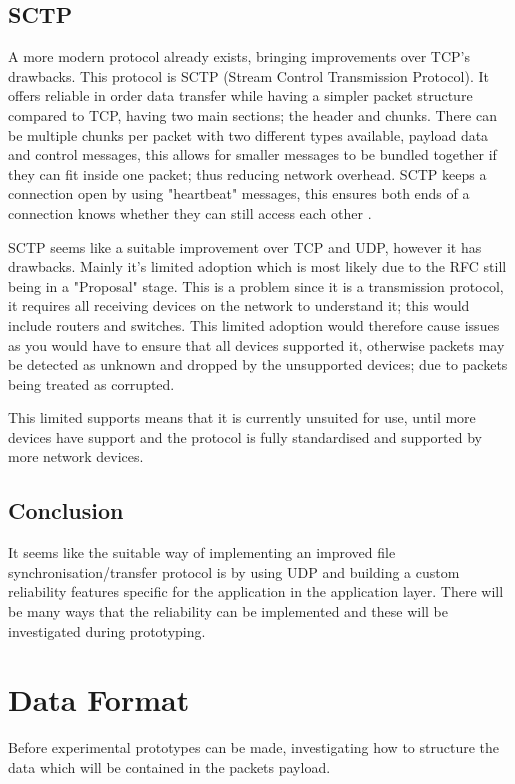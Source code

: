 \subsection*{SCTP}
A more modern protocol already exists, bringing improvements over TCP's drawbacks. This protocol is SCTP (Stream Control Transmission Protocol). It offers reliable in order data transfer while having a simpler packet structure compared to TCP, having two main sections; the header and chunks. There can be multiple chunks per packet with two different types available, payload data and control messages, this allows for smaller messages to be bundled together if they can fit inside one packet; thus reducing network overhead. SCTP keeps a connection open by using "heartbeat" messages, this ensures both ends of a connection knows whether they can still access each other \parencite{sctp-rfc9260}.

SCTP seems like a suitable improvement over TCP and UDP, however it has drawbacks. Mainly it's limited adoption which is most likely due to the RFC still being in a "Proposal" stage. This is a problem since it is a transmission protocol, it requires all receiving devices on the network to understand it; this would include routers and switches. This limited adoption would therefore cause issues as you would have to ensure that all devices supported it, otherwise packets may be detected as unknown and dropped by the unsupported devices; due to packets being treated as corrupted.

This limited supports means that it is currently unsuited for use, until more devices have support and the protocol is fully standardised and supported by more network devices.

\subsection*{Conclusion}
It seems like the suitable way of implementing an improved file synchronisation/transfer protocol is by using UDP and building a custom reliability features specific for the application in the application layer. There will be many ways that the reliability can be implemented and these will be investigated during prototyping.


\section{Data Format}
Before experimental prototypes can be made, investigating how to structure the data which will be contained in the packets payload.

